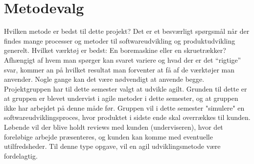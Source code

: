 \section{Metodevalg}\label{sec:valgafprocesmodel}
Hvilken metode er bedst til dette projekt? Det er et besværligt spørgsmål når der findes mange processer 
og metoder til softwareudvikling og produktudvikling generelt. Hvilket værktøj er bedst: En boremaskine 
eller en skruetrækker? Afhængigt af hvem man spørger kan svaret variere og hvad der er det “rigtige” svar, 
kommer an på hvilket resultat man forventer at få af de værktøjer man anvender. Nogle gange kan det være nødvendigt at anvende begge. \\

Projektgruppen har til dette semester valgt at udvikle agilt. Grunden til dette er at gruppen er blevet undervist i agile metoder i dette
semester, og at gruppen ikke har arbejdet på denne måde før. Gruppen vil i dette semester "simulere" en softwareudviklingsproces, hvor produktet
i sidste ende skal overrækkes til kunden. Løbende vil der blive holdt reviews med kunden (underviseren), hvor det foreløbige arbejde præsenteres,
og kunden kan komme med eventuelle utilfredsheder. Til denne type opgave, vil en agil udviklingsmetode være fordelagtig.    